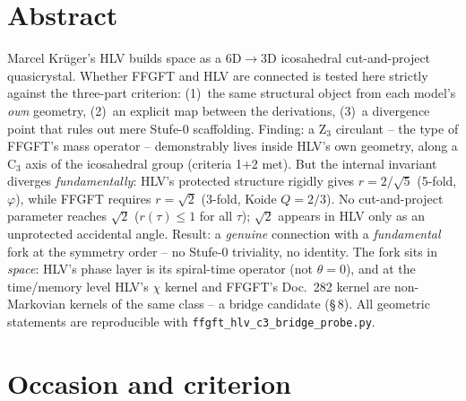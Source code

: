 
\section*{Abstract}
Marcel Kr\"uger's HLV builds space as a 6D$\to$3D icosahedral cut-and-project
quasicrystal. Whether FFGFT and HLV are connected is tested here strictly against
the three-part criterion: (1)~the same structural object from each model's
\emph{own} geometry, (2)~an explicit map between the derivations, (3)~a divergence
point that rules out mere Stufe-0 scaffolding. Finding: a Z$_3$ circulant -- the
type of FFGFT's mass operator -- demonstrably lives inside HLV's own geometry,
along a C$_3$ axis of the icosahedral group (criteria 1+2 met). But the internal
invariant diverges \emph{fundamentally}: HLV's protected structure rigidly gives
$r=2/\sqrt5$ (5-fold, $\varphi$), while FFGFT requires $r=\sqrt2$ (3-fold, Koide
$Q=2/3$). No cut-and-project parameter reaches $\sqrt2$ ($r(\tau)\le1$ for all
$\tau$); $\sqrt2$ appears in HLV only as an unprotected accidental angle. Result:
a \emph{genuine} connection with a \emph{fundamental} fork at the symmetry order --
no Stufe-0 triviality, no identity. The fork sits in \emph{space}: HLV's phase layer
is its spiral-time operator (not $\theta=0$), and at the time/memory level HLV's
$\chi$ kernel and FFGFT's Doc.~282 kernel are non-Markovian kernels of the same
class -- a bridge candidate (§\,8). All geometric statements are reproducible with
\texttt{ffgft\_hlv\_c3\_bridge\_probe.py}.

\section{Occasion and criterion}

